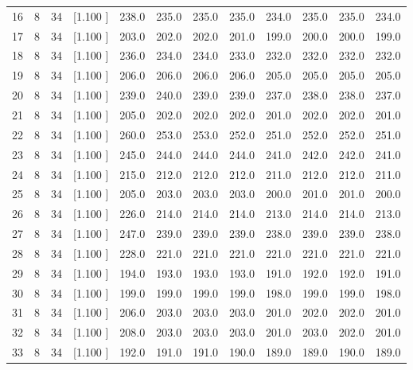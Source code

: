 \documentclass[12pt,a4paper]{article}
\begin{document}
\begin{center}
{\begin{tabular}{r r r r r r r r r r r r}
  16&  8& 34&[1.100     ]&   238.0&   235.0&   235.0&   235.0&   234.0&   235.0&   235.0&   234.0\\[-0.02in]
  17&  8& 34&[1.100     ]&   203.0&   202.0&   202.0&   201.0&   199.0&   200.0&   200.0&   199.0\\[-0.02in]
  18&  8& 34&[1.100     ]&   236.0&   234.0&   234.0&   233.0&   232.0&   232.0&   232.0&   232.0\\[-0.02in]
  19&  8& 34&[1.100     ]&   206.0&   206.0&   206.0&   206.0&   205.0&   205.0&   205.0&   205.0\\[-0.02in]
  20&  8& 34&[1.100     ]&   239.0&   240.0&   239.0&   239.0&   237.0&   238.0&   238.0&   237.0\\[-0.02in]
  21&  8& 34&[1.100     ]&   205.0&   202.0&   202.0&   202.0&   201.0&   202.0&   202.0&   201.0\\[-0.02in]
  22&  8& 34&[1.100     ]&   260.0&   253.0&   253.0&   252.0&   251.0&   252.0&   252.0&   251.0\\[-0.02in]
  23&  8& 34&[1.100     ]&   245.0&   244.0&   244.0&   244.0&   241.0&   242.0&   242.0&   241.0\\[-0.02in]
  24&  8& 34&[1.100     ]&   215.0&   212.0&   212.0&   212.0&   211.0&   212.0&   212.0&   211.0\\[-0.02in]
  25&  8& 34&[1.100     ]&   205.0&   203.0&   203.0&   203.0&   200.0&   201.0&   201.0&   200.0\\[-0.02in]
  26&  8& 34&[1.100     ]&   226.0&   214.0&   214.0&   214.0&   213.0&   214.0&   214.0&   213.0\\[-0.02in]
  27&  8& 34&[1.100     ]&   247.0&   239.0&   239.0&   239.0&   238.0&   239.0&   239.0&   238.0\\[-0.02in]
  28&  8& 34&[1.100     ]&   228.0&   221.0&   221.0&   221.0&   221.0&   221.0&   221.0&   221.0\\[-0.02in]
  29&  8& 34&[1.100     ]&   194.0&   193.0&   193.0&   193.0&   191.0&   192.0&   192.0&   191.0\\[-0.02in]
  30&  8& 34&[1.100     ]&   199.0&   199.0&   199.0&   199.0&   198.0&   199.0&   199.0&   198.0\\[-0.02in]
  31&  8& 34&[1.100     ]&   206.0&   203.0&   203.0&   203.0&   201.0&   202.0&   202.0&   201.0\\[-0.02in]
  32&  8& 34&[1.100     ]&   208.0&   203.0&   203.0&   203.0&   201.0&   203.0&   202.0&   201.0\\[-0.02in]
  33&  8& 34&[1.100     ]&   192.0&   191.0&   191.0&   190.0&   189.0&   189.0&   190.0&   189.0\\[-0.02in]

\end{tabular}}
\end{center}
\end{document}
